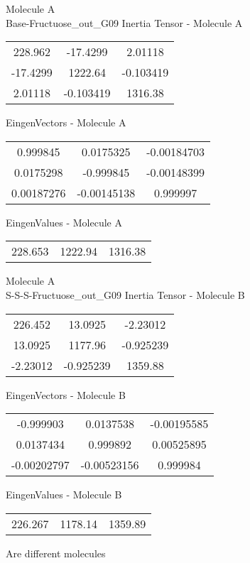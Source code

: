 \newpage
\begin{multicols}{2}
\begin{center}
Molecule A \\ 
Base-Fructuose_out_G09
Inertia Tensor - Molecule A \\
\vtab
\begin{tabular}{|c c c|}
228.962	 & 	-17.4299	 & 	2.01118	 \\
-17.4299	 & 	1222.64	 & 	-0.103419	 \\
2.01118	 & 	-0.103419	 & 	1316.38
\end{tabular}

\vtab
 EingenVectors - Molecule A     \\
\vtab
\begin{tabular}{|c c c|}
0.999845	 & 	0.0175325	 & 	-0.00184703	 \\
0.0175298	 & 	-0.999845	 & 	-0.00148399	 \\
0.00187276	 & 	-0.00145138	 & 	0.999997
\end{tabular}

\vtab
 EingenValues - Molecule A     \\
\vtab
\begin{tabular}{|c c c|}
228.653	 & 	1222.94	 & 	1316.38
\end{tabular}
\columnbreak
Molecule A \\ 
S-S-S-Fructuose_out_G09
Inertia Tensor - Molecule B \\
\vtab
\begin{tabular}{|c c c|}
226.452	 & 	13.0925	 & 	-2.23012	 \\
13.0925	 & 	1177.96	 & 	-0.925239	 \\
-2.23012	 & 	-0.925239	 & 	1359.88
\end{tabular}

\vtab
 EingenVectors - Molecule B     \\
\vtab
\begin{tabular}{|c c c|}
-0.999903	 & 	0.0137538	 & 	-0.00195585	 \\
0.0137434	 & 	0.999892	 & 	0.00525895	 \\
-0.00202797	 & 	-0.00523156	 & 	0.999984
\end{tabular}

\vtab
 EingenValues - Molecule B     \\
\vtab
\begin{tabular}{|c c c|}
226.267	 & 	1178.14	 & 	1359.89
\end{tabular}
\textcolor{NavyBlue}{\large Are different molecules}
\end{center}
\end{multicols}
